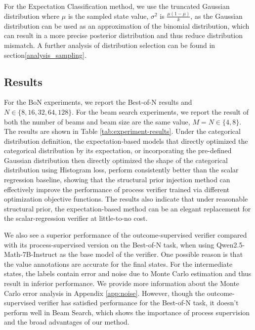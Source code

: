 For the Expectation Classification method, we use the truncated Gaussian distribution where $\mu$ is the sampled state value, $\sigma^2$ is $\frac{\mu(1-\mu)}{k}$, as the Gaussian distribution can be used as an approximation of the binomial distribution, which can result in a more precise posterior distribution and thus reduce distribution mismatch. A further analysis of distribution selection can be found in section\ref{analysis_sampling}.

\subsection{Results}

For the BoN experiments, we report the Best-of-N results and $N\in\{8,16,32,64,128\}$. For the beam search experiments, we report the result of both the number of beams and beam size are the same value, $M=N\in\{4,8\}$. The results are shown in Table \ref{tab:experiment-results}. Under the categorical distribution definition, the expectation-based models that directly optimized the categorical distribution by its expectation, or incorporating the pre-defined Gaussian distribution then directly optimized the shape of the categorical distribution using Histogram loss, perform consistently better than the scalar regression baseline, showing that the structural prior injection method can effectively improve the performance of process verifier trained via different optimization objective functions. The results also indicate that under reasonable structural prior, the expectation-based method can be an elegant replacement for the scalar-regression verifier at little-to-no cost.

We also see a superior performance of the outcome-supervised verifier compared with its process-supervised version on the Best-of-N task, when using Qwen2.5-Math-7B-Instruct as the base model of the verifier. One possible reason is that the value annotations are accurate for the final states. For the intermediate states, the labels contain error and noise due to Monte Carlo estimation and thus result in inferior performance. We provide more information about the Monte Carlo error analysis in Appendix \ref{app:noise}. However, though the outcome-supervised verifier has satisfied performance for the Best-of-N task, it doesn't perform well in Beam Search, which shows the importance of process supervision and the broad advantages of our method.
